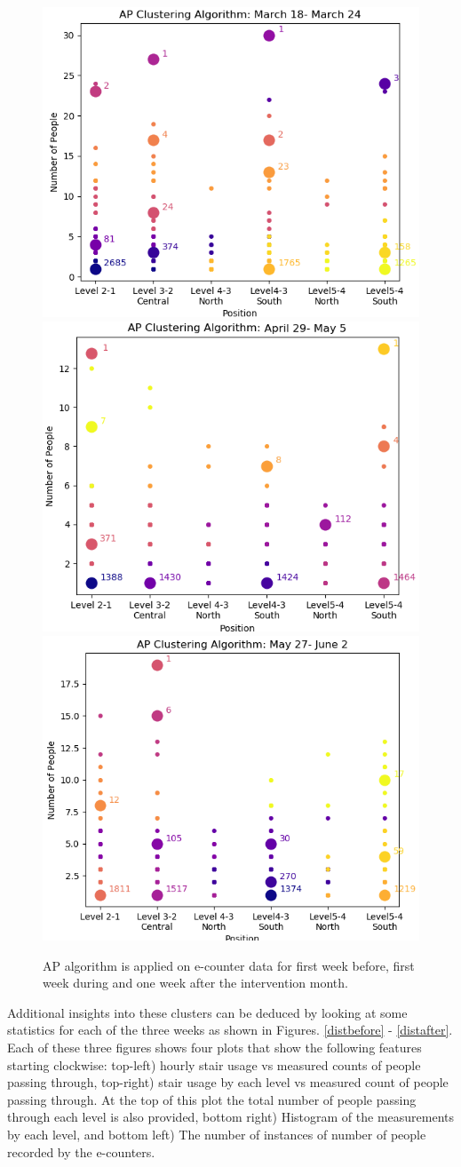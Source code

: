 \begin{figure}[!t]
\centering
\includegraphics[width=.49\textwidth]{image/Chapters/Chapter6/ApFirstWeekBeforeInt.png}
    \includegraphics[width=.49\textwidth]{image/Chapters/Chapter6/ApFirstWeekIntervention.png}\hfill\centering
    \includegraphics[width=.5\textwidth]{image/Chapters/Chapter6/ApFirstWeekAfterInt.png}
    \\[\smallskipamount]
\caption{AP algorithm is applied on e-counter data for first week before, first week during and one week after the intervention month. } 
\label{oneweek}
\end{figure}
 
 
Additional insights into these clusters can be deduced by looking at some statistics for each of the three weeks as shown in Figures. \ref{distbefore} - \ref{distafter}. Each of these three figures shows four plots that show the following features starting clockwise: top-left) hourly stair usage vs measured counts of people passing through, top-right) stair usage by each level vs measured count of people passing through. At the top of this plot the total number of people passing through each level is also provided, bottom right) Histogram of the measurements by each level, and bottom left) The number of instances of number of people recorded by the e-counters.


